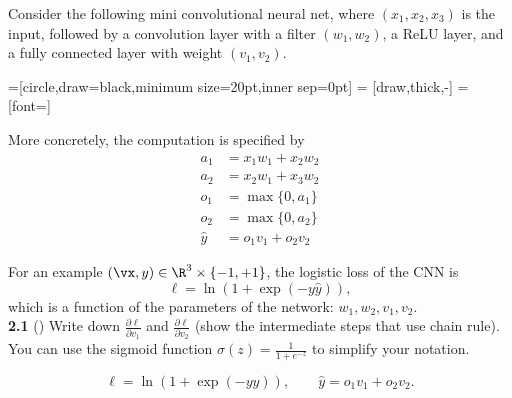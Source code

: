 Consider the following mini convolutional neural net, where $(x_1, x_2, x_3)$ is the input,
followed by a convolution layer with a filter $(w_1, w_2)$, a ReLU layer, and a fully connected layer with weight $(v_1, v_2)$.

 

=[circle,draw=black,minimum size=20pt,inner sep=0pt]
 = [draw,thick,-]
 = [font=\small]

\begin{center}
\end{center}

 

More concretely, the computation is specified by
\begin{align*}
a_1 &= x_1 w_1 + x_2 w_2 \\
a_2 &= x_2 w_1 + x_3 w_2 \\
o_1 &= \max\{0, a_1\} \\
o_2 &= \max\{0, a_2\} \\
\hat{y} &= o_1 v_1 + o_2 v_2 
\end{align*}

For an example $(\vx, y) \in \R^3 \times \{-1, +1\}$,  the logistic loss of the CNN is
\[
\ell = \ln(1 + \exp(-y\hat{y})),
\]
which is a function of the parameters of the network: $w_1, w_2, v_1, v_2$.\\


\textbf{2.1} ()
Write down $\frac{\partial \ell}{\partial v_1}$  and $\frac{\partial \ell}{\partial v_2}$ (show the intermediate steps that use chain rule).
You can use the sigmoid function $\sigma(z) = \frac{1}{1+e^{-z}}$ to simplify your notation.\\


\[
\ell = \ln(1+\exp(-y\hat y)),
\qquad
\hat y = o_1v_1 + o_2v_2.
\]

